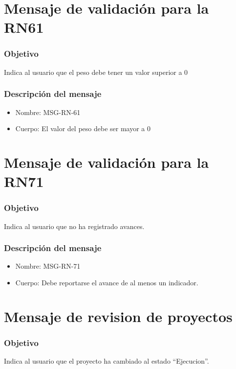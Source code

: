 \section{Mensaje de validación para la RN61} \label{MSG_RN61}

\subsubsection{Objetivo}
Indica al usuario que el peso debe tener un valor superior a 0

\subsubsection{Descripción del mensaje}
\begin{itemize}
\item Nombre: MSG-RN-61
\item Cuerpo: El valor del peso debe ser mayor a 0
\end{itemize}

\section{Mensaje de validación para la RN71} \label{MSG_RN71}

\subsubsection{Objetivo}
Indica al usuario que no ha registrado avances.

\subsubsection{Descripción del mensaje}
\begin{itemize}
\item Nombre: MSG-RN-71
\item Cuerpo: Debe reportarse el avance de al menos un indicador.
\end{itemize}


\section{Mensaje de revision de proyectos} \label{MSGg11}

\subsubsection{Objetivo}
Indica al usuario que el proyecto ha cambiado al estado ``Ejecucion''.

